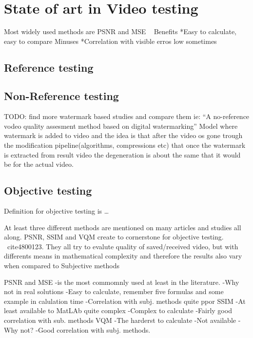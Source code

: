 
\section{State of art in Video testing}

Most widely used methods are PSNR and MSE ~\cite{4347144}
Benefits
*Easy to calculate, easy to compare
Minuses
*Correlation with visible erros low sometimes



\subsection{Reference testing}

\subsection{Non-Reference testing}




TODO: find more watermark based studies and compare them ie: ``A no-reference
vodeo quality assesment method based on digital watermarking''
Model where watermark is added to video and the idea is that after the video
os gone trough the modification pipeline(algorithms, compressions etc) that
once the watermark is extracted from result video the degeneration is about
the same that it would be for the actual video. ~\cite{1203346}



\subsection{Objective testing}

Definition for objective testing is {\ldots} 

At least three different methods are mentioned on many articles and
studies all along. PSNR, SSIM and VQM create to cornerstone for objective
testing. ~cite{4800123}. They all try to evalute quality of saved/received
video, but with differents means in mathematical complexity and therefore the
results also vary when compared to Subjective methods

PSNR and MSE
-is the most commomnly used at least in the literature. 
-Why not in real solutions 
-Easy to calculate, remember five formulas and some example in calulation time
-Correlation with subj. methods quite ppor
SSIM
-At least available to MatLAb quite complex
-Complex to calculate
-Fairly good correlation with sub. methods
VQM
-The harderst to calculate
-Not available
-Why not?
-Good correlation with subj. methods. 

